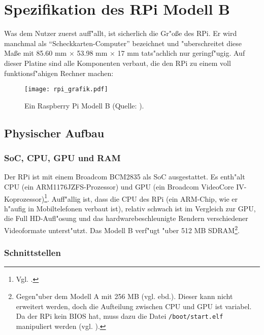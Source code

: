 \section{Spezifikation des RPi Modell B}\label{RPi-Spezi}

Was dem Nutzer zuerst auff"allt, ist sicherlich die Gr"o\ss e des RPi. Er wird manchmal als "`Scheckkarten-Computer"' bezeichnet und "uberschreitet diese Ma\ss e mit 85.60 mm $\times$ 53.98 mm $\times$ 17 mm tats"achlich nur geringf"ugig. Auf dieser Platine sind alle Komponenten verbaut, die den RPi zu einem voll funktionsf"ahigen Rechner machen:
\begin{figure}[htb]
	\centering
	\texttt{[image: rpi\_grafik.pdf]}\\ 
	\caption{Ein Raspberry Pi Modell B (Quelle: \cite{scrguide01}).}\label{fig:RPi-Spezifikation}
\end{figure}

\subsection{Physischer Aufbau}\label{RPi-Hardware}

\subsubsection{SoC, CPU, GPU und RAM}

Der RPi ist mit einem Broadcom BCM2835 als SoC ausgestattet. Es enth"alt CPU (ein ARM1176JZFS-Prozessor) und GPU (ein Broadcom VideoCore IV-Koprozessor)\footnote{Vgl. \cite{scrguide02}.}. Auff"allig ist, dass die CPU des RPi (ein ARM-Chip, wie er h"aufig in Mobiltelefonen verbaut ist), relativ schwach ist im Vergleich zur GPU, die Full HD-Aufl"osung und das hardwarebeschleunigte Rendern verschiedener Videoformate unterst"utzt. Das Modell B verf"ugt "uber 512 MB SDRAM\footnote{Gegen"uber dem Modell A mit 256 MB (vgl. ebd.). Dieser kann nicht erweitert werden, doch die Aufteilung zwischen CPU und GPU ist variabel. Da der RPi kein BIOS hat, muss dazu die Datei \texttt{/boot/start.elf} manipuliert werden (vgl. \cite{pow12}).}.

\subsubsection{Schnittstellen}\label{RPi-Schnittstellen}

